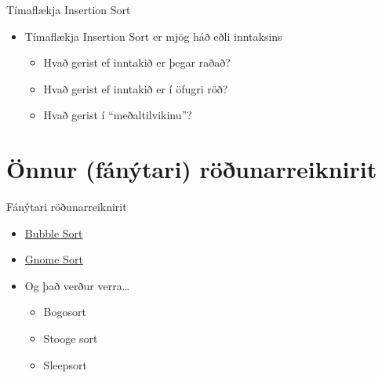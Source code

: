 \documentclass[handout]{beamer}
\begin{document}
\begin{frame}{Tímaflækja Insertion Sort}
\begin{itemize}
 \item Tímaflækja Insertion Sort er mjög háð eðli inntaksins
 \begin{itemize}
  \item Hvað gerist ef inntakið er þegar raðað?
  \item Hvað gerist ef inntakið er í öfugri röð?
  \item Hvað gerist í ``meðaltilvikinu''?
 \end{itemize}
\end{itemize}

\end{frame}


\section{Önnur (fánýtari) röðunarreiknirit}
\begin{frame}{Fánýtari röðunarreiknirit}
\begin{itemize}
 \item \href{https://en.wikipedia.org/wiki/Bubble\_sort}{Bubble Sort}
 \item \href{https://en.wikipedia.org/wiki/Gnome\_sort}{Gnome Sort}
 \item Og það verður verra\ldots
 \begin{itemize}
  \item Bogosort
  \item Stooge sort
  \item Sleepsort
 \end{itemize}
\end{itemize}

\end{frame}
\end{document}
